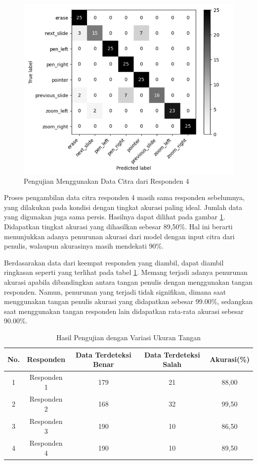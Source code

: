 \begin{figure}[ht]
  \centering
  \includegraphics[scale=0.55]{gambar/pengujian-ukuran-tangan/tangan-bakar.png}
  \caption{Pengujian Menggunakan Data Citra dari Responden 4}
  \label{fig:Pengujian Menggunakan Data Citra dari Responden 4}
\end{figure}

Proses pengambilan data citra responden 4 masih sama responden sebelumnya, yang dilakukan pada kondisi dengan tingkat akurasi paling ideal. Jumlah data yang digunakan juga sama persis. Hasilnya dapat dilihat pada gambar \ref{fig:Pengujian Menggunakan Data Citra dari Responden 4}. Didapatkan tingkat akurasi yang dihasilkan sebesar 89,50\%. Hal ini berarti menunjukkan adanya penurunan akurasi dari model dengan input citra dari penulis, walaupun akurasinya masih mendekati 90\%.

Berdasarakan data dari keempat responden yang diambil, dapat diambil ringkasan seperti yang terlihat pada tabel \ref{tb:Hasil Pengujian dengan Variasi Ukuran Tangan}. Memang terjadi adanya penurunan akurasi apabila dibandingkan antara tangan penulis dengan menggunakan tangan responden. Namun, penurunan yang terjadi tidak signifikan, dimana saat menggunakan tangan penulis akurasi yang didapatkan sebesar 99.00\%, sedangkan saat menggunakan tangan responden lain didapatkan rata-rata akurasi sebesar 90.00\%. 

\begin{longtable}{|c|c|c|c|c|}
  \caption{Hasil Pengujian dengan Variasi Ukuran Tangan}
  \label{tb:Hasil Pengujian dengan Variasi Ukuran Tangan}\\
  \hline
  \rowcolor[HTML]{FFFFFF}
  \textbf{No.} & \textbf{Responden} & \textbf{Data Terdeteksi Benar} & \textbf{Data Terdeteksi Salah} & \textbf{Akurasi(\%)} \\
  \hline
  1 & Responden 1  & 179 & 21 & 88,00  \\
  2 & Responden 2  & 168 & 32 & 99,50  \\
  3 & Responden 3  & 190 & 10 & 86,50  \\
  4 & Responden 4  & 190 & 10 & 89,50  \\
  \hline
\end{longtable}

